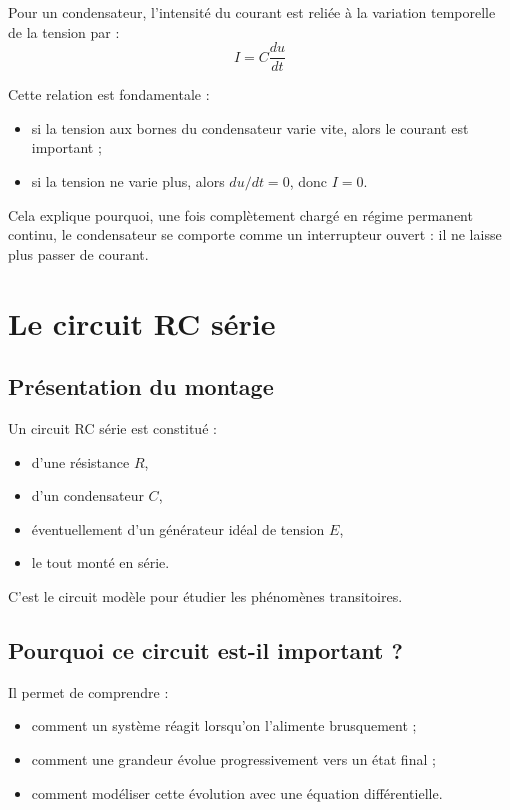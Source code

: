 \documentclass[11pt,a4paper]{article}
\begin{document}
\begin{propriete}
Pour un condensateur, l'intensité du courant est reliée à la variation temporelle de la tension par :
\[
I = C \frac{du}{dt}
\]
\end{propriete}

\begin{interpretation}
Cette relation est fondamentale :
\begin{itemize}
    \item si la tension aux bornes du condensateur varie vite, alors le courant est important ;
    \item si la tension ne varie plus, alors \(du/dt=0\), donc \(I=0\).
\end{itemize}
Cela explique pourquoi, une fois complètement chargé en régime permanent continu, le condensateur se comporte comme un interrupteur ouvert : il ne laisse plus passer de courant.
\end{interpretation}

\section{Le circuit RC série}

\subsection{Présentation du montage}

Un circuit RC série est constitué :
\begin{itemize}
    \item d'une résistance \(R\),
    \item d'un condensateur \(C\),
    \item éventuellement d'un générateur idéal de tension \(E\),
    \item le tout monté en série.
\end{itemize}

C'est le circuit modèle pour étudier les phénomènes transitoires.

\subsection{Pourquoi ce circuit est-il important ?}

Il permet de comprendre :
\begin{itemize}
    \item comment un système réagit lorsqu'on l'alimente brusquement ;
    \item comment une grandeur évolue progressivement vers un état final ;
    \item comment modéliser cette évolution avec une équation différentielle.
\end{itemize}
\end{document}
